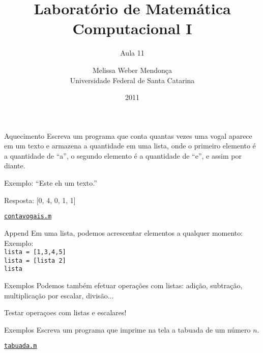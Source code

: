 \documentclass[hyperref={pdfpagelabels=false}]{beamer}
\title{Laboratório de Matemática Computacional I}
\subtitle{Aula 11}
\author[M. Weber Mendonça]{Melissa Weber Mendonça\\
Universidade Federal de Santa Catarina}
\date{2011}
\begin{document}
\setmonofont{Inconsolata}

\begin{frame}
  \titlepage
\end{frame}

\begin{frame}{Aquecimento}
	Escreva um programa que conta quantas vezes uma vogal aparece em um texto e armazena a quantidade em uma lista, onde o primeiro elemento é a quantidade de ``a'', o segundo elemento é a quantidade de ``e'', e assim por diante.

	Exemplo: ``Este eh um texto.''
	
	Resposta: [0, 4, 0, 1, 1]
	
	\begin{center} \href{listings/contavogais.m}{\underline{\texttt{contavogais.m}}} \end{center}
\end{frame}

\begin{frame}{Append}
  Em uma lista, podemos acrescentar elementos a qualquer momento:
  \vfill
  Exemplo:\\
  
  \hskip2cm {\texttt{lista = [1,3,4,5]}}\\
  \hskip2cm {\texttt{lista = [lista 2]}}\\
  \hskip2cm {\texttt{lista}}
\end{frame}

\begin{frame}{Exemplos}
  Podemos também efetuar operações com listas: adição, subtração, multiplicação por escalar, divisão...

	\begin{block}{}
    \begin{center}
      Testar operaçoes com listas e escalares!
    \end{center}
  \end{block}
\end{frame}

\begin{frame}{Exemplos}
	Escreva um programa que imprime na tela a tabuada de um número $n$.
	
	\begin{center} \href{listings/tabuada.m}{\underline{\texttt{tabuada.m}}} \end{center}
\end{frame}
\end{document}

